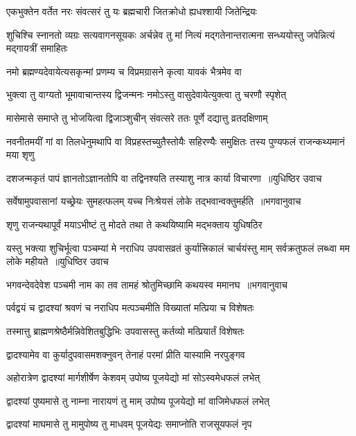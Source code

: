 \twolineshloka
{एकभुक्तेन वर्तेत नरः संवत्सरं तु यः}
{ब्रह्मचारी जितक्रोधो ह्यधश्शायी जितेन्द्रियः}


\threelineshloka
{शुचिश्चि स्नानतो व्यग्रः सत्यवागनसूयकः}
{अर्चन्नेव तु मां नित्यं मद्गतेनान्तरात्मना}
{सन्ध्ययोस्तु जपेन्नित्यं मद्गायत्रीं समाहितः}


\twolineshloka
{नमो ब्रह्मण्यदेवायेत्यसकृन्मां प्रणम्य च}
{विप्रमग्रासने कृत्वा यावकं भैत्रमेव वा}


\twolineshloka
{भुक्त्वा तु वाग्यतो भूमावाचान्तस्य द्विजन्मनः}
{नमोऽस्तु वासुदेवायेत्युक्त्वा तु चरणौ स्पृशेत्}


\twolineshloka
{मासेमासे समाप्ते तु भोजयित्वा द्विजाञ्शुचीन्}
{संवत्सरे ततः पूर्णे दद्यात्तु व्रतदक्षिणाम्}


\threelineshloka
{नवनीतमयीं गां वा तिलधेनुमथापि वा}
{विप्रहस्तच्युतैस्तोयैः सहिरण्यैः समुक्षितः}
{तस्य पुण्यफलं राजन्कथ्यमानं मया शृणु}


\threelineshloka
{दशजन्मकृतं पापं ज्ञानतोऽज्ञानतोपि वा}
{तद्विनश्यति तस्याशु नात्र कार्या विचारणा ॥युधिष्ठिर उवाच}
{}


\threelineshloka
{सर्वेषामुपवासानां यच्छ्रेयः सुमहत्फलम्}
{यच्च निःश्रेयसं लोके तद्भवान्वक्तुमर्हति ॥भगवानुवाच}
{}


\twolineshloka
{शृणु राजन्यथापूर्वं मयाऽभीष्टं तु मोदते}
{तथा ते कथयिष्यामि मद्भक्ताय युधिषठिर}


\fourlineindentedshloka
{यस्तु भक्त्या शुचिर्भूत्वा पञ्चम्यां मे नराधिप}
{उपवासव्रतं कुर्यात्त्रिकालं चार्चयंस्तु माम्}
{सर्वक्रतुफलं लब्ध्वा मम लोके महीयते ॥युधिष्ठिर उवाच}
{}


\threelineshloka
{भगवन्देवदेवेश पञ्चमी नाम का तव}
{तामहं श्रोतुमिच्छामि कथयस्व ममानघ ॥भगवानुवाच}
{}


\twolineshloka
{पर्वद्वयं च द्वादश्यां श्रवणं च नराधिप}
{मत्पञ्चमीति विख्यातां मत्प्रिया च विशेषतः}


\twolineshloka
{तस्मात्तु ब्राह्मणश्रेष्ठैर्मन्निवेशितबुद्धिभिः}
{उपवासस्तु कर्तव्यो मत्प्रियार्तं विशेषतः}


\twolineshloka
{द्वादश्यामेव वा कुर्यादुपवासमशक्नुवन्}
{तेनाहं परमां प्रीति यास्यामि नरपुङ्गव}


\twolineshloka
{अहोरात्रेण द्वादश्यां मार्गशीर्षेण केशवम्}
{उपोष्य पूजयेद्यो मां सोऽस्वमेधफलं लभेत्}


\twolineshloka
{द्वादश्यां पुष्यमासे तु नाम्ना नारायणं तु माम्}
{उपोष्य पूजयेद्यो मां वाजिमेधफलं लभेत्}


\twolineshloka
{द्वादश्यां माघमासे तु मामुपोष्य तु माधवम्}
{पूजयेद्यः समाप्नोति राजसूयफलं नृप}


